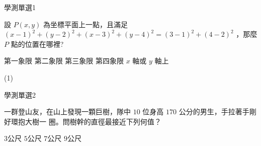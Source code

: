 \begin{QUESTIONS}
    \begin{QUESTION}
        \begin{ExamInfo}{91}{學測}{單選}{1}
        \end{ExamInfo}
        \begin{ExamAnsRateInfo}{76}{97}{83}{48}
        \end{ExamAnsRateInfo}
        \begin{QBODY}
            設 $P(x,y)$ 為坐標平面上一點，且滿足
            $(x-1)^2 +(y-2)^2 + (x-3)^2 +(y-4)^2 = (3-1)^2 +(4-2)^2$
            ，那麼 $P$ 點的位置在哪裡?
            
            \begin{QOPS} 
                \QOP 第一象限 
                \QOP 第二象限 
                \QOP 第三象限 
                \QOP 第四象限 
                \QOP $x$ 軸或 $y$ 軸上
            \end{QOPS}
        \end{QBODY}
        \begin{QFROMS}
        \end{QFROMS}
        \begin{QTAGS}\end{QTAGS}
        \begin{QANS}
            (1)
        \end{QANS}
        \begin{QSOLLIST}
        \end{QSOLLIST}
        \begin{QEMPTYSPACE}
        \end{QEMPTYSPACE}
    \end{QUESTION}
    \begin{QUESTION}
        \begin{ExamInfo}{91}{學測}{單選}{2}
        \end{ExamInfo}
        \begin{ExamAnsRateInfo}{51}{79}{51}{23}
        \end{ExamAnsRateInfo}
        \begin{QBODY}
            一群登山友，在山上發現一顆巨樹，隊中 $10$ 位身高 $170$ 公分的男生，手拉著手剛好環抱大樹一 圈。問樹幹的直徑最接近下列何值？ 
            \begin{QOPS} 
                \QOP $3$公尺 
                \QOP $5$公尺
                \QOP $7$公尺 
                \QOP $9$公尺 

\end{QOPS}
\end{QBODY}
\end{QUESTION}
\end{QUESTIONS}
